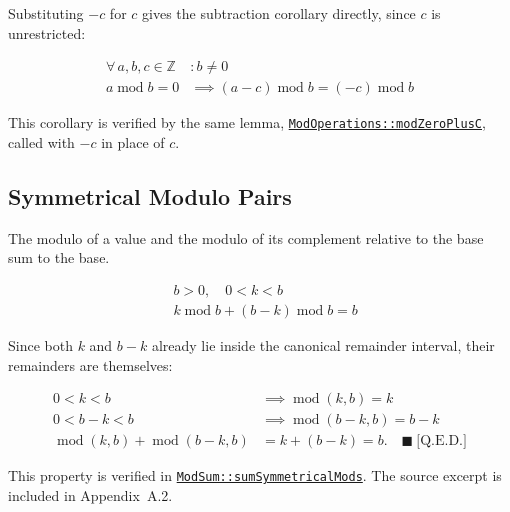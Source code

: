 Substituting $-c$ for $c$ gives the subtraction corollary directly, since
$c$ is unrestricted:

\begin{equation*}
\begin{aligned}
\forall\, a, b, c \in \mathbb{Z} &: b \neq 0 \\
a \operatorname{mod} b = 0
  &\implies ( a - c ) \operatorname{mod} b = ( -c ) \operatorname{mod} b
\end{aligned}
\end{equation*}

This corollary is verified by the same lemma,
\href{https://github.com/thiagomata/prime-numbers/blob/modulo-article-v1.0.0/src/main/scala/v1/chapter2/div/properties/ModOperations.scala#modZeroPlusC}{\texttt{ModOperations::modZeroPlusC}},
called with $-c$ in place of $c$.

\subsection{Symmetrical Modulo Pairs}
\label{sec:symmetrical-modulo-pairs}

The modulo of a value and the modulo of its complement relative to the base
sum to the base.

\begin{equation*}
\begin{aligned}
& b > 0,\quad 0 < k < b \\
& k \operatorname{mod} b + (b - k) \operatorname{mod} b = b
\end{aligned}
\end{equation*}

Since both $k$ and $b-k$ already lie inside the canonical remainder
interval, their remainders are themselves:

\begin{equation*}
\begin{aligned}
0<k<b &\implies \operatorname{mod}(k,b)=k \\
0<b-k<b &\implies \operatorname{mod}(b-k,b)=b-k \\
\operatorname{mod}(k,b)+\operatorname{mod}(b-k,b)
  &= k+(b-k)=b. \quad \blacksquare\ \text{[Q.E.D.]}
\end{aligned}
\end{equation*}

This property is verified in
\href{https://github.com/thiagomata/prime-numbers/blob/modulo-article-v1.0.0/src/main/scala/v1/chapter2/div/properties/ModSum.scala}{\texttt{ModSum::sumSymmetricalMods}}.
The source excerpt is included in Appendix~A.2.

